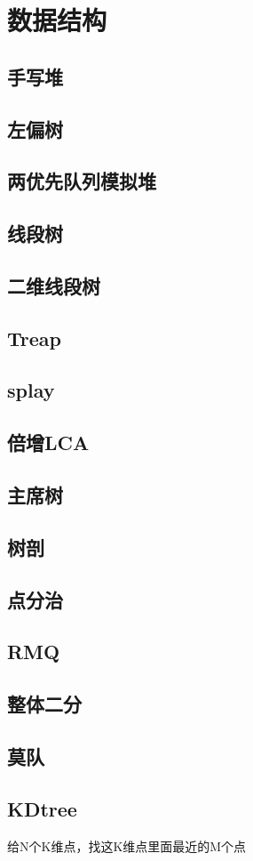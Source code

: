 \documentclass[main.tex]{subfiles}
\begin{document}
\chapter{数据结构}
\section{手写堆}
    
\section{左偏树}
    
\section{两优先队列模拟堆}
    
\section{线段树}
    
\section{二维线段树}
    
\section{Treap}
    
\section{splay}
    
\section{倍增LCA}
    
\section{主席树}
    
\section{树剖}
    
\section{点分治}
    
\section{RMQ}
    
\section{整体二分}
    
\section{莫队}
    
\section{KDtree}
    给N个K维点，找这K维点里面最近的M个点
    
\end{document}
